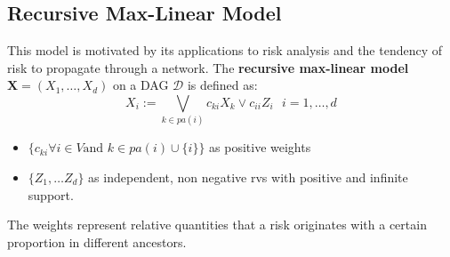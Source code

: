 \documentclass[12pt]{article}
\def\x{\mathbf{X}}
\newcommand{\ds}{\displaystyle}
\theoremstyle{definition}
\theoremstyle{definition}
\begin{document}
\subsection{Recursive Max-Linear Model}
 This model is motivated by its applications to risk analysis and the tendency of risk to propagate through a network. The \textbf{recursive max-linear model} $\x=(X_1,\hdots, X_d)$ on a DAG $\mathcal{D}$ is defined as:
$$X_i:= \bigvee_{k\in pa(i)}c_{ki}X_k \vee c_{ii}Z_i\ \ \  i=1,\hdots,d$$
\begin{itemize}
    \item $\ds \{c_{ki} \forall i \in V \text{and } k \in pa(i)\cup\{i\}\}$ as positive weights 
    \item $\{Z_1, \hdots Z_d\}$ as independent, non negative rvs with positive and infinite support.
\end{itemize}
The weights represent relative quantities that a risk originates with a certain proportion in different ancestors.
\end{document}
